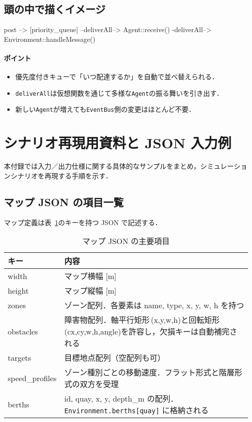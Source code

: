 \documentclass[10pt,letterpaper]{jsarticle}
\begin{document}
\subsection{頭の中で描くイメージ}
\begin{cmdcode}
post --> [priority_queue] --deliverAll--> Agent::receive()
                         \--deliverAll--> Environment::handleMessage()
\end{cmdcode}

\paragraph{ポイント}
\begin{itemize}
  \item 優先度付きキューで「いつ配達するか」を自動で並べ替えられる．
  \item \texttt{deliverAll}は仮想関数を通じて多様な\texttt{Agent}の振る舞いを引き出す．
  \item 新しい\texttt{Agent}が増えても\texttt{EventBus}側の変更はほとんど不要．
\end{itemize}

\section{シナリオ再現用資料と JSON 入力例}\label{app:repro}

本付録では入力／出力仕様に関する具体的なサンプルをまとめ，シミュレーションシナリオを再現する手順を示す．

\subsection{マップ JSON の項目一覧}
マップ定義は表~\ref{tab:mapjson}のキーを持つ JSON で記述する．
\begin{table}[htbp]
  \centering
  \begin{tabular}{ll}
    \toprule
    キー & 内容 \\
    \midrule
    width & マップ横幅 [m] \\
    height & マップ縦幅 [m] \\
    zones & ゾーン配列．各要素は name, type, x, y, w, h を持つ \\
    obstacles & 障害物配列．軸平行矩形\,(x,y,w,h)と回転矩形\,(cx,cy,w,h,angle)を許容し，欠損キーは自動補完される \\
    targets & 目標地点配列（空配列も可） \\
    speed\_profiles & ゾーン種別ごとの移動速度．フラット形式と階層形式の双方を受理 \\
    berths & {id, quay, x, y, depth\_m} の配列．\texttt{Environment.berths[quay]} に格納される \\
    \bottomrule
  \end{tabular}
  \caption{マップ JSON の主要項目}\label{tab:mapjson}
\end{table}
\end{document}
